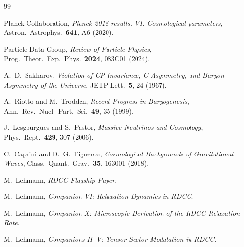 \documentclass[11pt,a4paper]{article}
\begin{document}
\begin{thebibliography}{99}

Planck Collaboration,
\textit{Planck 2018 results. VI. Cosmological parameters},
Astron.\ Astrophys.\ \textbf{641}, A6 (2020).

Particle Data Group,
\textit{Review of Particle Physics},
Prog.\ Theor.\ Exp.\ Phys.\ \textbf{2024}, 083C01 (2024).

A.~D.~Sakharov,
\textit{Violation of CP Invariance, C Asymmetry, and Baryon Asymmetry of the Universe},
JETP Lett.\ \textbf{5}, 24 (1967).

A.~Riotto and M.~Trodden,
\textit{Recent Progress in Baryogenesis},
Ann.\ Rev.\ Nucl.\ Part.\ Sci.\ \textbf{49}, 35 (1999).

J.~Lesgourgues and S.~Pastor,
\textit{Massive Neutrinos and Cosmology},
Phys.\ Rept.\ \textbf{429}, 307 (2006).

C.~Caprini and D.~G.~Figueroa,
\textit{Cosmological Backgrounds of Gravitational Waves},
Class.\ Quant.\ Grav.\ \textbf{35}, 163001 (2018).

M.~Lehmann,
\textit{RDCC Flagship Paper}.

M.~Lehmann,
\textit{Companion VI: Relaxation Dynamics in RDCC}.

M.~Lehmann,
\textit{Companion X: Microscopic Derivation of the RDCC Relaxation Rate}.

M.~Lehmann,
\textit{Companions II–V: Tensor-Sector Modulation in RDCC}.
\end{thebibliography}
\end{document}
